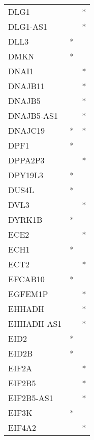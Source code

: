 \begin{longtable}{lcc}
DLG1             &                &          * \\
DLG1-AS1         &                &          * \\
DLL3             &              * &            \\
DMKN             &              * &            \\
DNAI1            &                &          * \\
DNAJB11          &                &          * \\
DNAJB5           &                &          * \\
DNAJB5-AS1       &                &          * \\
DNAJC19          &              * &          * \\
DPF1             &              * &            \\
DPPA2P3          &                &          * \\
DPY19L3          &              * &            \\
DUS4L            &              * &            \\
DVL3             &                &          * \\
DYRK1B           &              * &            \\
ECE2             &                &          * \\
ECH1             &              * &            \\
ECT2             &                &          * \\
EFCAB10          &              * &            \\
EGFEM1P          &                &          * \\
EHHADH           &                &          * \\
EHHADH-AS1       &                &          * \\
EID2             &              * &            \\
EID2B            &              * &            \\
EIF2A            &                &          * \\
EIF2B5           &                &          * \\
EIF2B5-AS1       &                &          * \\
EIF3K            &              * &            \\
EIF4A2           &                &          * \\

\end{longtable}
